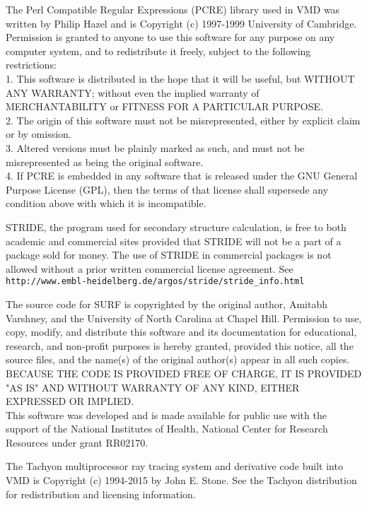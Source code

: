 \begin{itemize}
The Perl Compatible Regular Expressions (PCRE) library used in VMD
was written by Philip Hazel and is Copyright (c) 1997-1999 
University of Cambridge.  
\\
Permission is granted to anyone to use this software for any purpose on any
computer system, and to redistribute it freely, subject to the following
restrictions:
\\
1. This software is distributed in the hope that it will be useful,
   but WITHOUT ANY WARRANTY; without even the implied warranty of
   MERCHANTABILITY or FITNESS FOR A PARTICULAR PURPOSE.
\\
2. The origin of this software must not be misrepresented, either by
   explicit claim or by omission.
\\
3. Altered versions must be plainly marked as such, and must not be
   misrepresented as being the original software.
\\
4. If PCRE is embedded in any software that is released under the GNU
   General Purpose License (GPL), then the terms of that license shall
   supersede any condition above with which it is incompatible.

STRIDE, the program used for secondary structure calculation, is
free to both academic and commercial sites provided that STRIDE will
not be a part of a package sold for money.  The use of STRIDE in
commercial packages is not allowed without a prior written
commercial license agreement.  See
{\tt http://www.embl-heidelberg.de/argos/stride/stride\_info.html}

The source code for SURF is copyrighted by the original author,
Amitabh Varshney, and the University of North Carolina at Chapel Hill.
Permission to use, copy, modify, and distribute this software and its
documentation for educational, research, and non-profit purposes is
hereby granted, provided this notice, all the source files, and the
name(s) of the original author(s) appear in all such copies.
\\
BECAUSE THE CODE IS PROVIDED FREE OF CHARGE, IT IS PROVIDED "AS IS" AND
WITHOUT WARRANTY OF ANY KIND, EITHER EXPRESSED OR IMPLIED.
\\
This software was developed and is made available for public use with
the support of the National Institutes of Health, National Center for
Research Resources under grant RR02170.

The Tachyon multiprocessor ray tracing system and derivative code built
into VMD is Copyright (c) 1994-2015 by John E. Stone.
See the Tachyon distribution for redistribution and licensing information.


\end{itemize}
